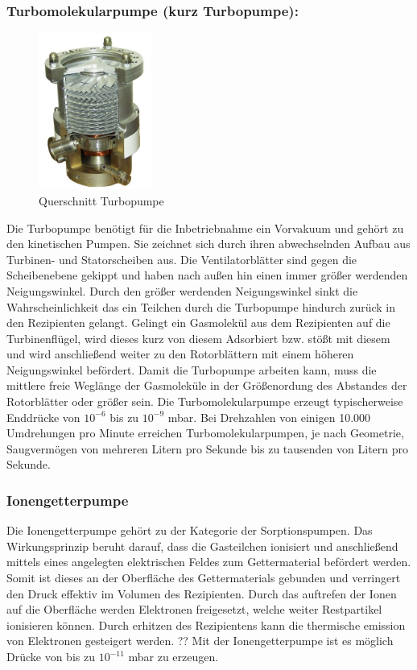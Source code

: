 \subsubsection{Turbomolekularpumpe (kurz Turbopumpe):}
\begin{figure}
    \vspace{-1cm}
    \centering
    \includegraphics[width=0.33\textwidth]{./picture/Turbo.jpg}
    \caption{Querschnitt Turbopumpe \cite{Turbo}}
    \label{fig:Turbo}
    \vspace{-0.5cm}
\end{figure}
Die Turbopumpe benötigt für die Inbetriebnahme ein Vorvakuum und gehört zu den kinetischen Pumpen. Sie zeichnet sich durch ihren abwechselnden Aufbau aus Turbinen-  und Statorscheiben aus. Die Ventilatorblätter sind gegen die Scheibenebene gekippt und haben nach außen hin einen immer größer werdenden Neigungswinkel. Durch den größer werdenden Neigungswinkel sinkt die Wahrscheinlichkeit das ein Teilchen durch die Turbopumpe hindurch zurück in den Rezipienten gelangt. Gelingt ein Gasmolekül aus dem Rezipienten auf die Turbinenflügel, wird dieses kurz von diesem Adsorbiert bzw. stößt mit diesem und wird anschließend weiter zu den Rotorblättern mit einem höheren Neigungswinkel befördert. Damit die Turbopumpe arbeiten kann, muss die mittlere freie Weglänge der Gasmoleküle in der Größenordung des Abstandes der Rotorblätter oder größer sein. Die Turbomolekularpumpe erzeugt typischerweise Enddrücke von $10^{-6}$ bis zu $10^{-9}$ mbar. Bei Drehzahlen von einigen 10.000 Umdrehungen pro Minute erreichen Turbomolekularpumpen, je nach Geometrie, Saugvermögen von mehreren Litern pro Sekunde bis zu tausenden von Litern pro Sekunde.

\subsubsection{Ionengetterpumpe}
Die Ionengetterpumpe gehört zu der Kategorie der Sorptionspumpen. Das Wirkungsprinzip beruht darauf, dass die Gasteilchen ionisiert und anschließend mittels eines angelegten elektrischen Feldes zum Gettermaterial befördert werden. Somit ist dieses an der Oberfläche des Gettermaterials gebunden und verringert den Druck effektiv im Volumen des Rezipienten. Durch das auftrefen der Ionen auf die Oberfläche werden Elektronen freigesetzt, welche weiter Restpartikel ionisieren können. Durch erhitzen des Rezipientens kann die thermische emission von Elektronen gesteigert werden.
\newline
??
\newline
Mit der Ionengetterpumpe ist es möglich Drücke von bis zu $10^{-11}$ mbar zu erzeugen.
